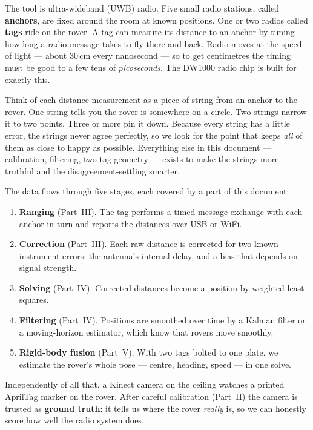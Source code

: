\documentclass[11pt,a4paper]{article}
\begin{document}
The tool is ultra-wideband (UWB) radio. Five small radio stations, called
\textbf{anchors}, are fixed around the room at known positions. One or two radios
called \textbf{tags} ride on the rover. A tag can measure its distance to an anchor
by timing how long a radio message takes to fly there and back. Radio moves at the
speed of light --- about 30\,cm every nanosecond --- so to get centimetres the
timing must be good to a few tens of \emph{picoseconds}. The DW1000 radio chip is
built for exactly this.

\begin{plainwords}
Think of each distance measurement as a piece of string from an anchor to the rover.
One string tells you the rover is somewhere on a circle. Two strings narrow it to two
points. Three or more pin it down. Because every string has a little error, the
strings never agree perfectly, so we look for the point that keeps \emph{all} of them
as close to happy as possible. Everything else in this document --- calibration,
filtering, two-tag geometry --- exists to make the strings more truthful and the
disagreement-settling smarter.
\end{plainwords}

The data flows through five stages, each covered by a part of this document:

\begin{enumerate}
\item \textbf{Ranging} (Part~III). The tag performs a timed message exchange with
      each anchor in turn and reports the distances over USB or WiFi.
\item \textbf{Correction} (Part~III). Each raw distance is corrected for two known
      instrument errors: the antenna's internal delay, and a bias that depends on
      signal strength.
\item \textbf{Solving} (Part~IV). Corrected distances become a position by weighted
      least squares.
\item \textbf{Filtering} (Part~IV). Positions are smoothed over time by a Kalman
      filter or a moving-horizon estimator, which know that rovers move smoothly.
\item \textbf{Rigid-body fusion} (Part~V). With two tags bolted to one plate, we
      estimate the rover's whole pose --- centre, heading, speed --- in one solve.
\end{enumerate}

Independently of all that, a Kinect camera on the ceiling watches a printed AprilTag
marker on the rover. After careful calibration (Part~II) the camera is trusted as
\textbf{ground truth}: it tells us where the rover \emph{really} is, so we can
honestly score how well the radio system does.
\end{document}
